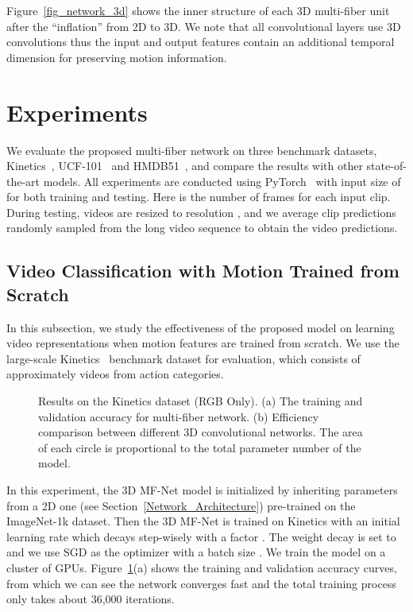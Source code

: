 \documentclass[runningheads]{llncs}
\newcommand{\ourslong}[0]{multi-fiber\xspace}
\begin{document}
Figure~\ref{fig_network_3d} shows the inner structure of each 3D \ourslong unit after the ``inflation'' from 2D to 3D. We note that all convolutional layers use 3D convolutions thus the input and output features contain an additional temporal dimension for preserving motion information. 

 
\section{Experiments}
\label{sec:experiments}

We evaluate the proposed \ourslong network on three benchmark datasets, Kinetics~\cite{kay2017kinetics}, UCF-101~\cite{soomro2012ucf101} and HMDB51~\cite{kuehne2011hmdb}, and compare the results with other state-of-the-art models. All experiments are conducted using PyTorch~\cite{paszke2017pytorch} with input size of  for both training and testing. Here  is the number of frames for each input clip. During testing, videos are resized to resolution , and we average clip predictions randomly sampled from the long video sequence to obtain the video predictions. 


\subsection{Video Classification with Motion Trained from Scratch}

In this subsection, we study the effectiveness of the proposed model on learning video representations when motion features are trained from scratch. We use the large-scale Kinetics~\cite{kay2017kinetics} benchmark dataset for evaluation, which consists of approximately  videos from  action categories.

\begin{figure}[t]
\centering
{}
\caption{Results on the Kinetics dataset (RGB Only). (a) The training and validation accuracy for \ourslong network. (b) Efficiency comparison between different 3D convolutional networks. The area of each circle is proportional to the total parameter number of the model.}
\label{fig_kinetics_curve_and_acc}
\end{figure}
In this experiment, the 3D MF-Net model is initialized by inheriting parameters from a 2D one (see Section~\ref{Network_Architecture}) pre-trained on the ImageNet-1k dataset. Then the 3D MF-Net is trained on Kinetics with an initial learning rate  which decays step-wisely with a factor . The weight decay is set to  and we use SGD as the optimizer with a batch size . We train the model on a cluster of  GPUs. Figure~\ref{fig_kinetics_curve_and_acc}(a) shows the training and validation accuracy curves, from which we can see the network converges fast and the total training process only takes about 36,000 iterations.
\end{document}
